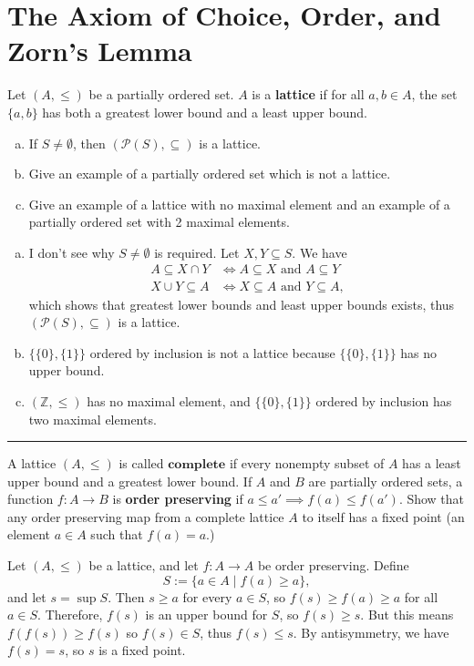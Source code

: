\section{The Axiom of Choice, Order, and Zorn's Lemma}

\begin{exercise}
    Let $(A,\le)$ be a partially ordered set. $A$ is a \textbf{lattice} if for all $a,b\in A$, the set $\{a,b\}$ has both a greatest lower bound and a least upper bound.
    \begin{enumerate}[(a)]
        \item If $S\ne \emptyset$, then $(\mathcal{P}(S),\subseteq)$ is a lattice.
        \item Give an example of a partially ordered set which is not a lattice.
        \item Give an example of a lattice with no maximal element and an example of a partially ordered set with 2 maximal elements.
    \end{enumerate}
\end{exercise}
\begin{solution}
    \begin{enumerate}[(a)]
        \item I don't see why $S\ne\emptyset$ is required. Let $X,Y\subseteq S$. We have 
        \begin{align*}
            A\subseteq X\cap Y &\iff A\subseteq X \text{ and } A\subseteq Y \\
            X\cup Y\subseteq A &\iff X\subseteq A \text{ and } Y\subseteq A, 
        \end{align*}
        which shows that greatest lower bounds and least upper bounds exists, thus $(\mathcal{P}(S),\subseteq)$ is a lattice.
        \item $\{\{0\},\{1\}\}$ ordered by inclusion is not a lattice because $\{\{0\},\{1\}\}$ has no upper bound.
        \item $(\mathbb{Z},\le)$ has no maximal element, and $\{\{0\},\{1\}\}$ ordered by inclusion has two maximal elements.
    \end{enumerate}
\end{solution}
\hrule
\begin{exercise}
    A lattice $(A,\le)$ is called $\textbf{complete}$ if every nonempty subset of $A$ has a least upper bound and a greatest lower bound. If $A$ and $B$ are partially ordered sets, a function $f:A\to B$ is \textbf{order preserving} if $a\le a' \implies f(a)\le f(a')$. Show that any order preserving map from a complete lattice $A$ to itself has a fixed point (an element $a\in A$ such that $f(a) = a$.)
\end{exercise}
\begin{solution}
    Let $(A,\le)$ be a lattice, and let $f:A\to A$ be order preserving. Define $$S := \{a\in A\mid f(a) \ge a\},$$
    and let $s = \sup S$. Then $s \ge a$ for every $a\in S$, so $f(s) \ge f(a) \ge a$ for all $a\in S$. Therefore, $f(s)$ is an upper bound for $S$, so $f(s) \ge s$. But this means $f(f(s)) \ge f(s)$ so $f(s)\in S$, thus $f(s) \le s$. By antisymmetry, we have $f(s) = s$, so $s$ is a fixed point.
\end{solution}

